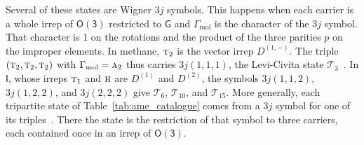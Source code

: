 \documentclass[
  reprint,
  aps,
  prx,
  superscriptaddress,
  amsmath,
  amssymb,
  longbibliography
]{revtex4-2}
\newcommand{\grp}[1]{\mathsf{#1}}
\newcommand{\irr}[1]{\text{\normalfont\scshape #1}}
\newcommand{\irrJ}[1]{D^{(#1)}}
\newcommand{\irrJp}[2]{D^{(#1,#2)}}
\newcommand{\parity}{p}               %
\providecommand{\Gmol}{\Gamma_{\mathrm{mol}}}
\newcommand{\catT}[1]{\mathcal{T}_{#1}}
\begin{document}
\begin{table}[t]
\caption{The 21 AME states of the coupling tensors of the 75 point groups, up to LU and the order of the carriers. The format lists the carrier dimensions in increasing order, and $N$ is the dimension of the coupling space. In the last column, axial means the non-Abelian axial groups together with $\grp{C_{\infty v}}$ and $\grp{D_{\infty h}}$. Cubic means $\grp{T}$, $\grp{T_{h}}$, $\grp{T_{d}}$, $\grp{O}$, and $\grp{O_{h}}$, and icos.\ means $\grp{I}$ and $\grp{I_{h}}$. The state $\catT{1}$ does not occur in $\grp{C_{4v}}$, $\grp{D_{4}}$, $\grp{D_{2d}}$, or $\grp{D_{4h}}$. The states $\catT{3}$ and $\catT{4}$ have $N=2$ in $\grp{T}$ and $\grp{T_{h}}$ and $N=1$ elsewhere. For $N=2$ the states listed have definite $K$, the total angular momentum of a pair of equal carriers. Trine-GHZ is $\tfrac{1}{\sqrt3}\sum_{i}\ket{a_i}\ket{i}\ket{i}$, with $\ket{a_i}$ the three trine states of a qubit. Reference~\cite{DasRepo2026} gives every tensor and the triples of each state.}
\label{tab:ame_catalogue}


\end{table}

Several of these states are Wigner $3j$ symbols. This happens when each carrier is a whole irrep of $\grp{O(3)}$ restricted to $\grp{G}$ and $\Gmol$ is the character of the $3j$ symbol. That character is $1$ on the rotations and the product of the three parities $\parity$ on the improper elements. In methane, $\irr{t}_{2}$ is the vector irrep $\irrJp{1}{-}$. The triple $(\irr{t}_{2},\irr{t}_{2},\irr{t}_{2})$ with $\Gmol=\irr{a}_{2}$ thus carries $3j(1,1,1)$, the Levi-Civita state $\catT{3}$~\cite{FitziGisinMaurer2001, Cabello2002}. In $\grp{I}$, whose irreps $\irr{t}_{1}$ and $\irr{h}$ are $\irrJ{1}$ and $\irrJ{2}$, the symbols $3j(1,1,2)$, $3j(1,2,2)$, and $3j(2,2,2)$ give $\catT{6}$, $\catT{10}$, and $\catT{15}$. More generally, each tripartite state of Table~\ref{tab:ame_catalogue} comes from a $3j$ symbol for one of its triples~\cite{DasRepo2026}. There the state is the restriction of that symbol to three carriers, each contained once in an irrep of $\grp{O(3)}$.
\end{document}
